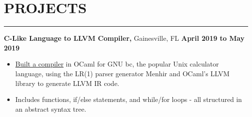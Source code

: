 \section*{PROJECTS}

\hrule \relax
\sectionheaderspace

\noindent\textbf{C-Like Language to LLVM Compiler,} Gainesville, FL  \hfill\textbf{April 2019 to May 2019}
\begin{itemize}[noitemsep,nolistsep, label={-}]
	\item \href{https://github.com/hodsonus/programming-language-concepts}{Built a compiler} in OCaml for GNU bc, the popular Unix calculator language, using the LR(1) parser generator Menhir and OCaml's LLVM library to generate LLVM IR code.
	\item Includes functions, if/else statements, and while/for loops - all structured in an abstract syntax tree.
\end{itemize}
\subsectionspace